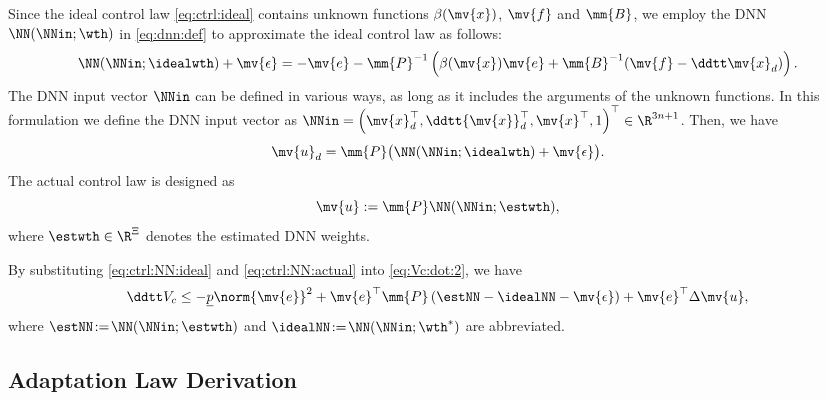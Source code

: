 \documentclass[letterpaper, journal, twoside]{IEEEtran}
\begin{document}
Since the ideal control law \eqref{eq:ctrl:ideal} contains unknown functions $\beta(\mv{x})$, $\mv{f}$ and $\mm{B}$, we employ the DNN $\NN(\NNin;\wth)$ in \eqref{eq:dnn:def} to approximate the ideal control law as follows:
\begin{equation*}
  \NN(\NNin;\idealwth)
  +
  \mv{\epsilon}
  =
  -\mv{e}
  -
  \mm{P}^{-1}
  \left(
  \beta(\mv{x})\mv{e}
  +
  \mm{B}^{-1}
  (
    \mv{f}
    -
    \ddtt \mv{x}_d
  )
  \right)
  .
\end{equation*}
The DNN input vector $\NNin$ can be defined in various ways, as long as it includes the arguments of the unknown functions.
In this formulation we define the DNN input vector as
$
  \NNin 
  = 
  \left(
    \mv{x}_d^\top, 
    \ddtt{\mv{x}}_d^\top, 
    \mv{x}^\top, 
    1 
  \right)^\top
  \in\R^{3n+1}
$.
Then, we have 
\begin{equation} \label{eq:ctrl:NN:ideal}
  \mv{u}_d
  =
  \mm{P}
  \big(
    \NN(\NNin;\idealwth)
    +
    \mv{\epsilon}
  \big)
  .
\end{equation}
The actual control law is designed as 
\begin{equation} \label{eq:ctrl:NN:actual}
  \mv{u}
  :=
  \mm{P}
  \NN(\NNin;\estwth)
  ,
\end{equation}
where $\estwth\in\R^{\Xi}$ denotes the estimated DNN weights.

By substituting \eqref{eq:ctrl:NN:ideal} and \eqref{eq:ctrl:NN:actual} into \eqref{eq:Vc:dot:2}, we have
\begin{equation} \label{eq:Vc:dot:3}
  \ddtt V_c
  \le
  - \underline{p}
  \norm{\mv{e}}^2
  +
  \mv{e}^\top\mm{P}
  \left(
    \estNN - \idealNN
    - \mv{\epsilon}
  \right)
  +
  \mv{e}^\top
  \Delta\mv{u}
  ,
\end{equation}
where $\estNN\!:=\!\NN(\NNin;\estwth)$ and $\idealNN\!:=\!\NN(\NNin;\wth^*)$ are abbreviated.

\subsection{Adaptation Law Derivation} \label{sec:main:result:sub:adap:laws}
\end{document}
